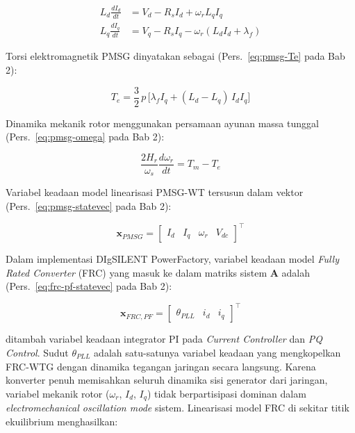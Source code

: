 \begin{align}
    L_d \frac{dI_d}{dt} &= V_d - R_s I_d + \omega_r L_q I_q
    \label{eq:pmsg_Id_ch3} \\[4pt]
    L_q \frac{dI_q}{dt} &= V_q - R_s I_q - \omega_r(L_d I_d + \lambda_f)
    \label{eq:pmsg_Iq_ch3}
\end{align}

Torsi elektromagnetik PMSG dinyatakan sebagai (Pers.~\ref{eq:pmsg-Te} pada
Bab 2):

\begin{equation}
    T_e = \frac{3}{2}\,p\,\bigl[\lambda_f I_q + (L_d - L_q)\,I_d I_q\bigr]
    \label{eq:pmsg_Te_ch3}
\end{equation}

Dinamika mekanik rotor menggunakan persamaan ayunan massa tunggal
(Pers.~\ref{eq:pmsg-omega} pada Bab 2):

\begin{equation}
    \frac{2H_r}{\omega_s}\frac{d\omega_r}{dt} = T_m - T_e
    \label{eq:pmsg_omega_ch3}
\end{equation}

Variabel keadaan model linearisasi PMSG-WT tersusun dalam vektor
(Pers.~\ref{eq:pmsg-statevec} pada Bab 2):

\begin{equation}
    \mathbf{x}_{PMSG} =
    \begin{bmatrix}I_d & I_q & \omega_r & V_{dc}\end{bmatrix}^\top
    \label{eq:pmsg_state_ch3}
\end{equation}

Dalam implementasi DIgSILENT PowerFactory, variabel keadaan model \textit{Fully
Rated Converter} (FRC) yang masuk ke dalam matriks sistem $\mathbf{A}$ adalah
(Pers.~\ref{eq:frc-pf-statevec} pada Bab 2):

\begin{equation}
    \mathbf{x}_{FRC,PF} =
    \begin{bmatrix}\theta_{PLL} & i_d & i_q\end{bmatrix}^\top
    \label{eq:pmsg_pf_state_ch3}
\end{equation}

ditambah variabel keadaan integrator PI pada \textit{Current Controller} dan
\textit{PQ Control}. Sudut $\theta_{PLL}$ adalah satu-satunya variabel keadaan
yang mengkopelkan FRC-WTG dengan dinamika tegangan jaringan secara langsung.
Karena konverter penuh memisahkan seluruh dinamika sisi generator dari jaringan,
variabel mekanik rotor ($\omega_r$, $I_d$, $I_q$) tidak berpartisipasi dominan
dalam \textit{electromechanical oscillation mode} sistem. Linearisasi model FRC
di sekitar titik ekuilibrium menghasilkan:

